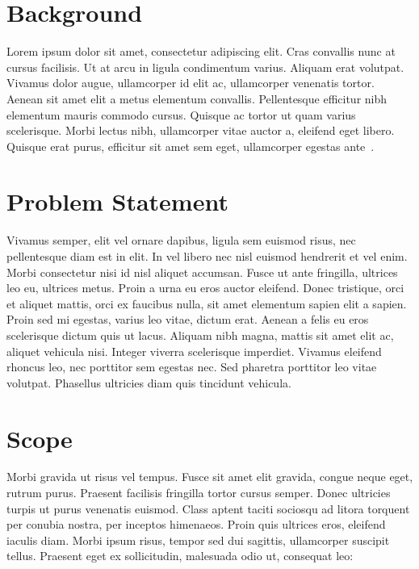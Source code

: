 \section{Background}
Lorem ipsum dolor sit amet, consectetur adipiscing elit. Cras convallis nunc at cursus facilisis. Ut at arcu in ligula condimentum varius. Aliquam erat volutpat. Vivamus dolor augue, ullamcorper id elit ac, ullamcorper venenatis tortor. Aenean sit amet elit a metus elementum convallis. Pellentesque efficitur nibh elementum mauris commodo cursus. Quisque ac tortor ut quam varius scelerisque. Morbi lectus nibh, ullamcorper vitae auctor a, eleifend eget libero. Quisque erat purus, efficitur sit amet sem eget, ullamcorper egestas ante~\cite{WQR2122}.

\section{Problem Statement}
Vivamus semper, elit vel ornare dapibus, ligula sem euismod risus, nec pellentesque diam est in elit. In vel libero nec nisl euismod hendrerit et vel enim. Morbi consectetur nisi id nisl aliquet accumsan. Fusce ut ante fringilla, ultrices leo eu, ultrices metus. Proin a urna eu eros auctor eleifend. Donec tristique, orci et aliquet mattis, orci ex faucibus nulla, sit amet elementum sapien elit a sapien. Proin sed mi egestas, varius leo vitae, dictum erat. Aenean a felis eu eros scelerisque dictum quis ut lacus. Aliquam nibh magna, mattis sit amet elit ac, aliquet vehicula nisi. Integer viverra scelerisque imperdiet. Vivamus eleifend rhoncus leo, nec porttitor sem egestas nec. Sed pharetra porttitor leo vitae volutpat. Phasellus ultricies diam quis tincidunt vehicula.

\section{Scope}
Morbi gravida ut risus vel tempus. Fusce sit amet elit gravida, congue neque eget, rutrum purus. Praesent facilisis fringilla tortor cursus semper. Donec ultricies turpis ut purus venenatis euismod. Class aptent taciti sociosqu ad litora torquent per conubia nostra, per inceptos himenaeos. Proin quis ultrices eros, eleifend iaculis diam. Morbi ipsum risus, tempor sed dui sagittis, ullamcorper suscipit tellus. Praesent eget ex sollicitudin, malesuada odio ut, consequat leo:

